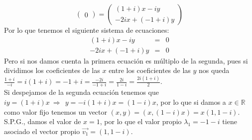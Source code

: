 \begin{enumerate}
\begin{itemize}
\[\begin{pmatrix}
0\end{pmatrix}=\begin{pmatrix}(1+i)x-iy\\
-2ix+(-1+i)y\end{pmatrix}\]
Por lo que tenemos el siguiente sistema de ecuaciones:
\begin{eqnarray*}
(1+i)x-iy&=&0\\
-2ix+(-1+i)y&=&0
\end{eqnarray*}
Pero si nos damos cuenta la primera ecuaci\'on es m\'ultiplo de la segunda, pues si dividimos los coeficientes de las $x$ entre los coeficientes de las $y$ nos queda $\displaystyle\frac{1+i}{-i}=i(1+i)=-1+i=\frac{-2i}{-1+i}=\frac{2i}{1-i}=\frac{2i(1+i)}{2}$.\\
Si despejamos de la segunda ecuaci\'on tenemos que $iy=(1+i)x~\Longrightarrow~~y=-i(1+i)x=(1-i)x$, por lo que si damos a $x\in\mathbb{R}$ como valor fijo tenemos un vector $(x,y)=(x,(1-i)x)=x(1,1-i)$.\\
S.P.G., damos el valor de $x=1$, por lo que el valor propio $\lambda_1=-1-i$ tiene asociado el vector propio $\vec{v_1}=(1,1-i)$.


\end{itemize}
\end{enumerate}
